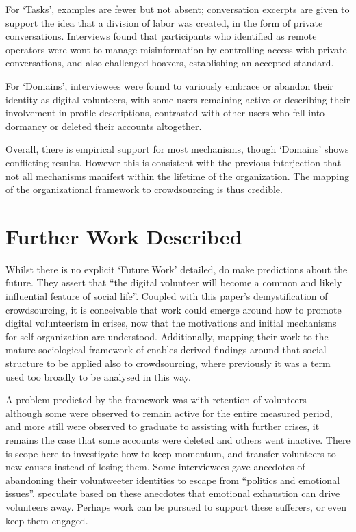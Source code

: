 \documentclass[a4paper,12pt]{article}
\begin{document}
For `Tasks', examples are fewer but not absent; conversation excerpts are given to support the idea that a division of labor was created, in the form of private conversations. Interviews found that participants who identified as remote operators were wont to manage misinformation by controlling access with private conversations, and also challenged hoaxers, establishing an accepted standard.

For `Domains', interviewees were found to variously embrace or abandon their identity as digital volunteers, with some users remaining active or describing their involvement in profile descriptions, contrasted with other users who fell into dormancy or deleted their accounts altogether.

Overall, there is empirical support for most mechanisms, though `Domains' shows conflicting results. However this is consistent with the previous interjection that not all mechanisms manifest within the lifetime of the organization. The mapping of the organizational framework to crowdsourcing is thus credible.

\section{Further Work Described}
Whilst there is no explicit `Future Work' detailed, \citeauthor{Starbird:2011:VSD:1978942.1979102} do make predictions about the future. They assert that ``the digital volunteer will become a common and likely influential feature of social life''. Coupled with this paper's demystification of crowdsourcing, it is conceivable that work could emerge around how to promote digital volunteerism in crises, now that the motivations and initial mechanisms for self-organization are understood. Additionally, mapping their work to the mature sociological framework of \citeauthor{kreps1994organizing} enables derived findings around that social structure to be applied also to crowdsourcing, where previously it was a term used too broadly to be analysed in this way.

A problem predicted by the framework was with retention of volunteers --- although some were observed to remain active for the entire measured period, and more still were observed to graduate to assisting with further crises, it remains the case that some accounts were deleted and others went inactive. There is scope here to investigate how to keep momentum, and transfer volunteers to new causes instead of losing them. Some interviewees gave anecdotes of abandoning their voluntweeter identities to escape from ``politics and emotional issues''. \citeauthor{Starbird:2011:VSD:1978942.1979102} speculate based on these anecdotes that emotional exhaustion can drive volunteers away. Perhaps work can be pursued to support these sufferers, or even keep them engaged.
\end{document}
